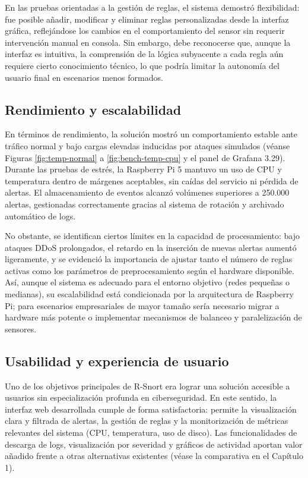 \documentclass[11pt,a4paper,twoside]{report}
\begin{document}
En las pruebas orientadas a la gestión de reglas, el sistema demostró flexibilidad: fue posible añadir, modificar y eliminar reglas personalizadas desde la interfaz gráfica, reflejándose los cambios en el comportamiento del sensor sin requerir intervención manual en consola. Sin embargo, debe reconocerse que, aunque la interfaz es intuitiva, la comprensión de la lógica subyacente a cada regla aún requiere cierto conocimiento técnico, lo que podría limitar la autonomía del usuario final en escenarios menos formados.

\subsection{Rendimiento y escalabilidad}

En términos de rendimiento, la solución mostró un comportamiento estable ante tráfico normal y bajo cargas elevadas inducidas por ataques simulados (véanse Figuras \ref{fig:temp-normal} a \ref{fig:bench-temp-cpu} y el panel de Grafana 3.29). Durante las pruebas de estrés, la Raspberry Pi 5 mantuvo un uso de CPU y temperatura dentro de márgenes aceptables, sin caídas del servicio ni pérdida de alertas. El almacenamiento de eventos alcanzó volúmenes superiores a 250.000 alertas, gestionadas correctamente gracias al sistema de rotación y archivado automático de logs.\newline

No obstante, se identifican ciertos límites en la capacidad de procesamiento: bajo ataques DDoS prolongados, el retardo en la inserción de nuevas alertas aumentó ligeramente, y se evidenció la importancia de ajustar tanto el número de reglas activas como los parámetros de preprocesamiento según el hardware disponible. Así, aunque el sistema es adecuado para el entorno objetivo (redes pequeñas o medianas), su escalabilidad está condicionada por la arquitectura de Raspberry Pi; para escenarios empresariales de mayor tamaño sería necesario migrar a hardware más potente o implementar mecanismos de balanceo y paralelización de sensores.

\subsection{Usabilidad y experiencia de usuario}

Uno de los objetivos principales de R-Snort era lograr una solución accesible a usuarios sin especialización profunda en ciberseguridad. En este sentido, la interfaz web desarrollada cumple de forma satisfactoria: permite la visualización clara y filtrada de alertas, la gestión de reglas y la monitorización de métricas relevantes del sistema (CPU, temperatura, uso de disco). Las funcionalidades de descarga de logs, visualización por severidad y gráficos de actividad aportan valor añadido frente a otras alternativas existentes (véase la comparativa en el Capítulo 1).\newline
\end{document}
